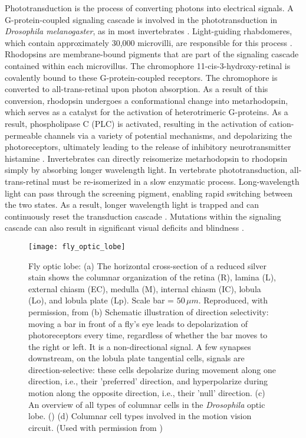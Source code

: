 Phototransduction is the process of converting photons into electrical signals. A G-protein-coupled signaling cascade is involved in the phototransduction in \textit{Drosophila melanogaster}, as in most invertebrates \parencite{Hardie2015}. Light-guiding rhabdomeres, which contain approximately 30,000 microvilli, are responsible for this process \parencite{Hardie2001}. Rhodopsins are membrane-bound pigments that are part of the signaling cascade contained within each microvillus. The chromophore 11-cis-3-hydroxy-retinal is covalently bound to these G-protein-coupled receptors. The chromophore is converted to all-trans-retinal upon photon absorption. As a result of this conversion, rhodopsin undergoes a conformational change into metarhodopsin, which serves as a catalyst for the activation of heterotrimeric G-proteins. As a result, phospholipase C (PLC) is activated, resulting in the activation of cation-permeable channels via a variety of potential mechanisms, and depolarizing the photoreceptors, ultimately leading to the release of inhibitory neurotransmitter histamine \parencite{Hardie2001}. Invertebrates can directly reisomerize metarhodopsin to rhodopsin simply by absorbing longer wavelength light. In vertebrate phototransduction, all-trans-retinal must be re-isomerized in a slow enzymatic process. Long-wavelength light can pass through the screening pigment, enabling rapid switching between the two states. As a result, longer wavelength light is trapped and can continuously reset the transduction cascade \parencite{Hardie2001}. Mutations within the signaling cascade can also result in significant visual deficits and blindness \parencite{Hardie2012}.

\begin{figure}
\centering
\hspace*{-1cm} 
\texttt{[image: fly\_optic\_lobe]}
\caption[Fly optic lobe] {Fly optic lobe: (a) The horizontal cross-section of a reduced silver stain shows the columnar organization of the retina (R), lamina (L), external chiasm (EC), medulla (M), internal chiasm (IC), lobula (Lo), and lobula plate (Lp). Scale bar = $50 \, \mu m$. Reproduced, with permission, from \cite{Takemura2008} (b) Schematic illustration of direction selectivity: moving a bar in front of a fly's eye leads to depolarization of photoreceptors every time, regardless of whether the bar moves to the right or left. It is a non-directional signal. A few synapses downstream, on the lobula plate tangential cells, signals are direction-selective: these cells depolarize during movement along one direction, i.e., their 'preferred' direction, and hyperpolarize during motion along the opposite direction, i.e., their 'null' direction. (c) An overview of all types of columnar cells in the \textit{Drosophila} optic lobe. (\cite{Fischbach1989}) (d) Columnar cell types involved in the motion vision circuit. (Used with permission from \cite{Borst2020, Borst2020b})}
\label{fig:opticlobe}
\end{figure}

